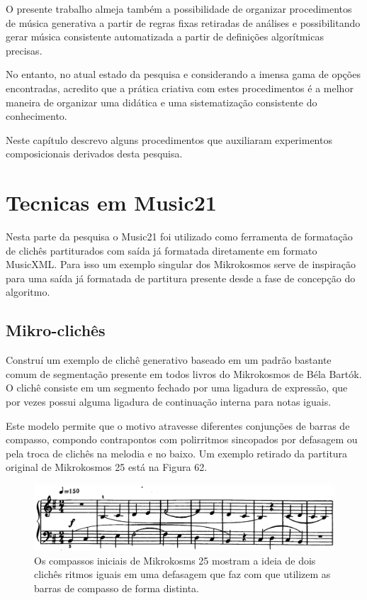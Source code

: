 \documentclass[
	12pt,				%
	openright,			%
	twoside,			%
	a4paper,			%
	english,			%
	french,				%
	spanish,			%
	brazil				%
	]{abntex2}
\begin{document}
O presente trabalho almeja também a possibilidade de organizar procedimentos de música generativa a partir de regras fixas retiradas de análises e possibilitando gerar música consistente automatizada a partir de definições algorítmicas precisas. 

No entanto, no atual estado da pesquisa e considerando a imensa gama de opções encontradas, acredito que a prática criativa com estes procedimentos é a melhor maneira de organizar uma didática e uma sistematização consistente do conhecimento. 

Neste capítulo descrevo alguns procedimentos que auxiliaram experimentos composicionais derivados desta pesquisa. 

\section{Tecnicas em Music21}

Nesta parte da pesquisa o Music21 foi utilizado como ferramenta de formatação de clichês partiturados com saída já formatada diretamente em formato MusicXML. Para isso um exemplo singular dos Mikrokosmos serve de inspiração para uma saída já formatada de partitura presente desde a fase de concepção do algoritmo.

\subsection{Mikro-clichês}
\label{mikrocliches}

Construí um exemplo de clichê generativo baseado em um padrão bastante comum de segmentação presente em todos livros do Mikrokosmos de Béla Bartók. O clichê consiste em um segmento fechado por uma ligadura de expressão, que por vezes possui alguma ligadura de continuação interna para notas iguais. 

Este modelo permite que o motivo atravesse diferentes conjunções de barras de compasso, compondo contrapontos com polirritmos sincopados por defasagem ou pela troca de clichês na melodia e no baixo. Um exemplo retirado da partitura original de Mikrokosmos 25 está na Figura 62.

\begin{figure}[!h]
	\caption{\label{fig_grafico}Os compassos iniciais de Mikrokosms 25 mostram a ideia de dois clichês ritmos iguais em uma defasagem que faz com que utilizem as barras de compasso de forma distinta. }
	\begin{center}
	    \includegraphics[scale=0.35]{score/mikro25.png}
	\end{center}
\end{figure}
\end{document}
